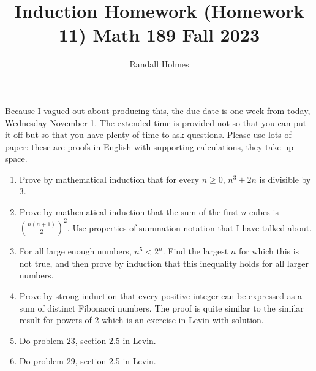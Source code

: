 \documentclass[12pt]{article}
\title{Induction Homework (Homework 11) Math 189 Fall 2023}
\author{Randall Holmes}
\begin{document}
\maketitle

Because I vagued out about producing this, the due date is one week from today, Wednesday November 1.  The extended time is provided not so that you can put it off but so that you have
plenty of time to ask questions.   Please use lots of paper:  these are proofs in English with supporting calculations, they take up space.

\begin{enumerate}

\item  Prove by mathematical induction that for every $n \geq 0$,  $n^3+2n$ is divisible by 3.

\item  Prove by mathematical induction that the sum of the first $n$ cubes is $\left(\frac{n(n+1)}2\right)^2$.  Use properties of summation notation that I have talked about.

\item  For all large enough numbers, $n^5 < 2^n$.  Find the largest $n$ for which this is not true, and then prove by induction that this inequality holds for all larger numbers.

\item  Prove by strong induction that every positive integer can be expressed as a sum of distinct Fibonacci numbers.  The proof is quite similar to the similar result for powers of 2 which is an exercise in Levin with solution.

\item  Do problem 23, section 2.5 in Levin.

\item  Do problem 29, section 2.5 in Levin.

\end{enumerate}
\end{document}
